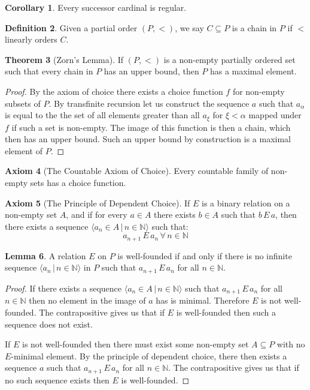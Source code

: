 \documentclass{article}
\theoremstyle{definition}
\newtheorem{thm}{Theorem}[section]
\newtheorem{crly}[thm]{Corollary}
\newtheorem{defn}[thm]{Definition}
\newtheorem{axm}[thm]{Axiom}
\newtheorem{lmma}[thm]{Lemma}
\newcommand{\N}{\mathbb{N}}
\begin{document}
\begin{crly}
    Every successor cardinal is regular.
\end{crly}

\begin{defn}
    Given a partial order $(P,<)$, we say $C \subseteq P$ is a chain in $P$ if $<$ linearly orders $C$.
\end{defn}

\begin{thm}[Zorn's Lemma]
    If $(P, <)$ is a non-empty partially ordered set such that every chain in $P$ has an upper bound, then $P$ has a maximal element.
\end{thm}

\begin{proof}
    By the axiom of choice there exists a choice function $f$ for non-empty subsets of $P$. By transfinite recursion let us construct the sequence $a$ such that $a_\alpha$ is equal to the the set of all elements greater than all $a_\xi$ for $\xi < \alpha$ mapped under $f$ if such a set is non-empty. The image of this function is then a chain, which then has an upper bound. Such an upper bound by construction is a maximal element of $P$.
\end{proof}

\begin{axm}[The Countable Axiom of Choice]
    Every countable family of non-empty sets has a choice function.
\end{axm}

\begin{axm}[The Principle of Dependent Choice]
    If $E$ is a binary relation on a non-empty set $A$, and if for every $a \in A$ there exists $b \in A$ such that $b \, E \, a$, then there exists a sequence $\langle a_n \in A \, | \, n \in \N \rangle$ such that:
    \[
        a_{n + 1} \, E \, a_n \, \forall \, n \in \N    
    \]
\end{axm}

\begin{lmma}
    A relation $E$ on $P$ is well-founded if and only if there is no infinite sequence $\langle a_n \, | \, n \in \N \rangle$ in $P$ such that $a_{n + 1} \, E \, a_n$ for all $n \in \N$.
\end{lmma}

\begin{proof}
    If there exists a sequence $\langle a_n \in A \, | \, n \in \N\rangle$ such that $a_{n + 1} \, E \, a_n$ for all $n \in \N$ then no element in the image of $a$ has is minimal. Therefore $E$ is not well-founded. The contrapositive gives us that if $E$ is well-founded then such a sequence does not exist.

    If $E$ is not well-founded then there must exist some non-empty set $A \subseteq P$ with no $E$-minimal element. By the principle of dependent choice, there then exists a sequence $a$ such that $a_{n + 1} \, E \, a_n$ for all $n \in \N$. The contrapositive gives us that if no such sequence exists then $E$ is well-founded.
\end{proof}
\end{document}
